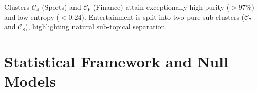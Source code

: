 \begin{table}[htbp]
\centering
\small
\renewcommand{\arraystretch}{1.2}
\caption{Contingency table, purity, and entropy for $K=9$ clustering on \textit{LA Documents} (Tan et al.~\cite{tan2018}).}
\label{tab:dm-la-documents-en}
\end{table}

Clusters $\mathcal{C}_4$ (Sports) and $\mathcal{C}_6$ (Finance) attain exceptionally high purity ($>97\%$) and low entropy ($<0.24$). Entertainment is split into two pure sub-clusters ($\mathcal{C}_7$ and $\mathcal{C}_8$), highlighting natural sub-topical separation.

\section{Statistical Framework and Null Models}
\label{sec:dm-statistical-null-models}

